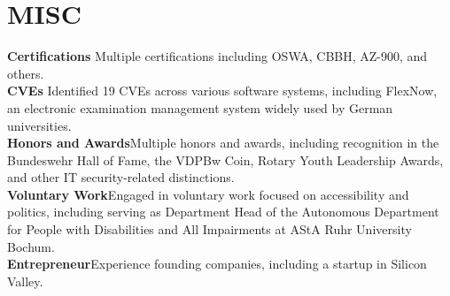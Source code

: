 \documentclass[letterpaper,11pt]{article}
\begin{document}
\section{MISC}
\begin{itemize}[leftmargin=0in, label={}]
    \small{\item{
     \textbf{Certifications} {Multiple certifications including OSWA, CBBH, AZ-900, and others.}
\vspace{1pt} \\
     \textbf{CVEs} {Identified 19 CVEs across various software systems, including FlexNow, an electronic examination management system widely used by German universities.}\vspace{1pt} \\
     \textbf{Honors and Awards}{Multiple honors and awards, including recognition in the Bundeswehr Hall of Fame, the VDPBw Coin, Rotary Youth Leadership Awards, and other IT security-related distinctions.}
\vspace{1pt} \\
     \textbf{Voluntary Work}{Engaged in voluntary work focused on accessibility and politics, including serving as Department Head of the Autonomous Department for People with Disabilities and All Impairments at AStA Ruhr University Bochum.}
\vspace{1pt} \\
     \textbf{Entrepreneur}{Experience founding companies, including a startup in Silicon Valley.}
    }}
 \end{itemize}
\end{document}
